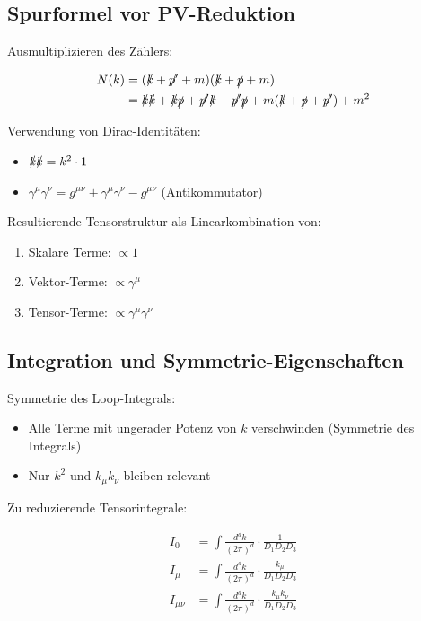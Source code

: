 	\subsection{Spurformel vor PV-Reduktion}
	
	Ausmultiplizieren des Zählers:
	
	\begin{align}
		N(k) &= (\slashed{k} + \slashed{p'} + m)(\slashed{k} + \slashed{p} + m)\\
		&= \slashed{k}\slashed{k} + \slashed{k}\slashed{p} + \slashed{p'}\slashed{k} + \slashed{p'}\slashed{p} + m(\slashed{k} + \slashed{p} + \slashed{p'}) + m^2
	\end{align}
	
	Verwendung von Dirac-Identitäten:
	\begin{itemize}
		\item $\slashed{k}\slashed{k} = k^2 \cdot 1$
		\item $\gamma^\mu\gamma^\nu = g^{\mu\nu} + \gamma^\mu\gamma^\nu - g^{\mu\nu}$ (Antikommutator)
	\end{itemize}
	
	Resultierende Tensorstruktur als Linearkombination von:
	\begin{enumerate}
		\item Skalare Terme: $\propto 1$
		\item Vektor-Terme: $\propto \gamma^\mu$  
		\item Tensor-Terme: $\propto \gamma^\mu\gamma^\nu$
	\end{enumerate}
	
	\subsection{Integration und Symmetrie-Eigenschaften}
	
	Symmetrie des Loop-Integrals:
	\begin{itemize}
		\item Alle Terme mit ungerader Potenz von $k$ verschwinden (Symmetrie des Integrals)
		\item Nur $k^2$ und $k_\mu k_\nu$ bleiben relevant
	\end{itemize}
	
	Zu reduzierende Tensorintegrale:
	
	\begin{align}
		I_0 &= \int \frac{d^d k}{(2\pi)^d} \cdot \frac{1}{D_1 D_2 D_3}\\
		I_\mu &= \int \frac{d^d k}{(2\pi)^d} \cdot \frac{k_\mu}{D_1 D_2 D_3}\\
		I_{\mu\nu} &= \int \frac{d^d k}{(2\pi)^d} \cdot \frac{k_\mu k_\nu}{D_1 D_2 D_3}
	\end{align}
	
